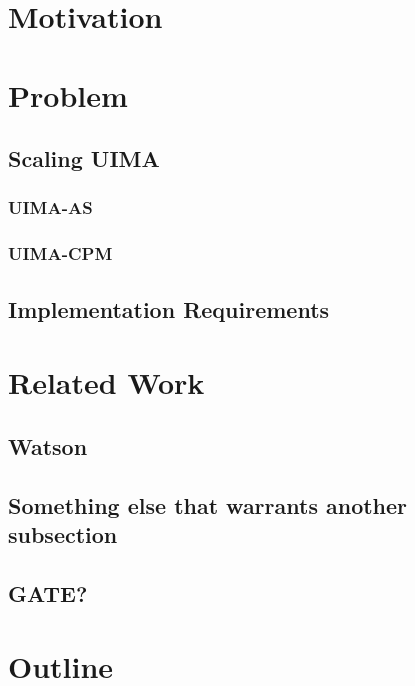 \section{Motivation}



\section{Problem}
\subsection{Scaling UIMA}
\subsubsection{UIMA-AS}
\subsubsection{UIMA-CPM}
\subsection{Implementation Requirements}


\section{Related Work}

\subsection{Watson}

\subsection{Something else that warrants another subsection}

\subsection{GATE?}


\section{Outline}